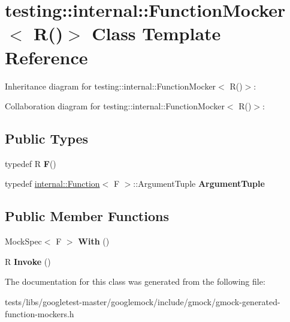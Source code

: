 \hypertarget{classtesting_1_1internal_1_1FunctionMocker_3_01R_07_08_4}{}\section{testing\+:\+:internal\+:\+:Function\+Mocker$<$ R()$>$ Class Template Reference}
\label{classtesting_1_1internal_1_1FunctionMocker_3_01R_07_08_4}


Inheritance diagram for testing\+:\+:internal\+:\+:Function\+Mocker$<$ R()$>$\+:


Collaboration diagram for testing\+:\+:internal\+:\+:Function\+Mocker$<$ R()$>$\+:
\subsection*{Public Types}
\begin{DoxyCompactItemize}
\item 
\mbox{\label{classtesting_1_1internal_1_1FunctionMocker_3_01R_07_08_4_a2c1d7da413176d87405227df90a95521}} 
typedef R {\bfseries F}()
\item 
\mbox{\label{classtesting_1_1internal_1_1FunctionMocker_3_01R_07_08_4_a5a279e0d8414bf0809405c06a0725b66}} 
typedef \hyperlink{structtesting_1_1internal_1_1Function}{internal\+::\+Function}$<$ F $>$\+::Argument\+Tuple {\bfseries Argument\+Tuple}
\end{DoxyCompactItemize}
\subsection*{Public Member Functions}
\begin{DoxyCompactItemize}
\item 
\mbox{\label{classtesting_1_1internal_1_1FunctionMocker_3_01R_07_08_4_a4bd0ee604f6917fcfe8aae52a1f47cf3}} 
Mock\+Spec$<$ F $>$ {\bfseries With} ()
\item 
\mbox{\label{classtesting_1_1internal_1_1FunctionMocker_3_01R_07_08_4_a8096a10aea2ffc6a78d0437855d2ef10}} 
R {\bfseries Invoke} ()
\end{DoxyCompactItemize}


The documentation for this class was generated from the following file\+:\begin{DoxyCompactItemize}
\item 
tests/libs/googletest-\/master/googlemock/include/gmock/gmock-\/generated-\/function-\/mockers.\+h\end{DoxyCompactItemize}
